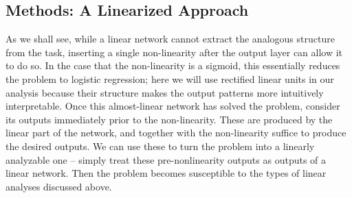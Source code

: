 \documentclass[10pt,letterpaper]{article}
\begin{document}
\subsection{Methods: A Linearized Approach}
As we shall see, while a linear network cannot extract the analogous structure from the task, inserting a single non-linearity after the output layer can allow it to do so. In the case that the non-linearity is a sigmoid, this essentially reduces the problem to logistic regression; here we will use rectified linear units in our analysis because their structure makes the output patterns more intuitively interpretable. Once this almost-linear network has solved the problem, consider its outputs immediately prior to the non-linearity. These are produced by the linear part of the network, and together with the non-linearity suffice to produce the desired outputs. We can use these to turn the problem into a linearly analyzable one -- simply treat these pre-nonlinearity outputs as outputs of a linear network. Then the problem becomes susceptible to the types of linear analyses discussed above.\par 
\end{document}
